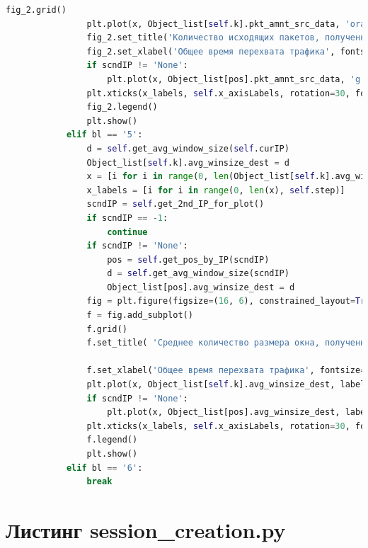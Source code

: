 \documentclass[bachelor, och, coursework]{SCWorks}
\begin{document}
\begin{lstlisting}[language=Python]
                fig_2.grid()
                plt.plot(x, Object_list[self.k].pkt_amnt_src_data, 'orange', label=self.curIP)
                fig_2.set_title('Количество исходящих пакетов, полученных за единицу времени (общий порт {self.curPort})', fontsize=15 )
                fig_2.set_xlabel('Общее время перехвата трафика', fontsize=15)
                if scndIP != 'None':
                    plt.plot(x, Object_list[pos].pkt_amnt_src_data, 'g', label=scndIP)
                plt.xticks(x_labels, self.x_axisLabels, rotation=30, fontsize=8)
                fig_2.legend()
                plt.show()
            elif bl == '5':
                d = self.get_avg_window_size(self.curIP)
                Object_list[self.k].avg_winsize_dest = d
                x = [i for i in range(0, len(Object_list[self.k].avg_winsize_dest))]
                x_labels = [i for i in range(0, len(x), self.step)]
                scndIP = self.get_2nd_IP_for_plot()
                if scndIP == -1:
                    continue
                if scndIP != 'None':
                    pos = self.get_pos_by_IP(scndIP)
                    d = self.get_avg_window_size(scndIP)
                    Object_list[pos].avg_winsize_dest = d
                fig = plt.figure(figsize=(16, 6), constrained_layout=True)
                f = fig.add_subplot()
                f.grid()
                f.set_title( 'Среднее количество размера окна, полученных за единицу времени (общий порт {self.curPort})', fontsize=15 )

                f.set_xlabel('Общее время перехвата трафика', fontsize=15)
                plt.plot(x, Object_list[self.k].avg_winsize_dest, label=self.curIP + '(получатель)')
                if scndIP != 'None':
                    plt.plot(x, Object_list[pos].avg_winsize_dest, label=scndIP + '(получатель)')
                plt.xticks(x_labels, self.x_axisLabels, rotation=30, fontsize=10)
                f.legend()
                plt.show()
            elif bl == '6':
                break
    \end{lstlisting}

    \section{Листинг session\_creation.py}
\end{document}
